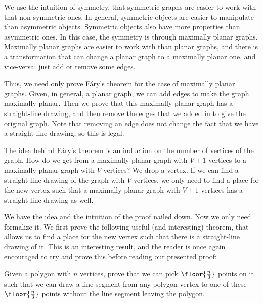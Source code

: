 \documentclass[11pt,paper=letter]{scrartcl}
\begin{document}
We use the intuition of symmetry, that symmetric graphs are easier to work with that non-symmetric ones. In general, symmetric objects are easier to manipulate than asymmetric objects. Symmetric objects also have more properties than asymmetric ones. In this case, the symmetry is through maximally planar graphs. Maximally planar graphs are easier to work with than planar graphs, and there is a transformation that can change a planar graph to a maximally planar one, and vice-versa: just add or remove some edges.

Thus, we need only prove F\'{a}ry's theorem for the case of maximally planar graphs. Given, in general, a planar graph, we can add edges to make the graph maximally planar. Then we prove that this maximally planar graph has a straight-line drawing, and then remove the edges that we added in to give the original graph. Note that removing an edge does not change the fact that we have a straight-line drawing, so this is legal.

The idea behind F\'{a}ry's theorem is an induction on the number of vertices of the graph. How do we get from a maximally planar graph with $V + 1$ vertices to a maximally planar graph with $V$ vertices? We drop a vertex. If we can find a straight-line drawing of the graph with $V$ vertices, we only need to find a place for the new vertex such that a maximally planar graph with $V + 1$ vertices has a straight-line drawing as well.

We have the idea and the intuition of the proof nailed down. Now we only need formalize it. We first prove the following useful (and interesting) theorem, that allows us to find a place for the new vertex such that there is a straight-line drawing of it. This is an interesting result, and the reader is once again encouraged to try and prove this before reading our presented proof:

\begin{problem}
Given a polygon with $n$ vertices, prove that we can pick $\floor{\frac{n}{3}}$ points on it such that we can draw a line segment from any polygon vertex to one of these $\floor{\frac{n}{3}}$ points without the line segment leaving the polygon.
\end{problem}

\begin{center}
\end{center}
\end{document}

